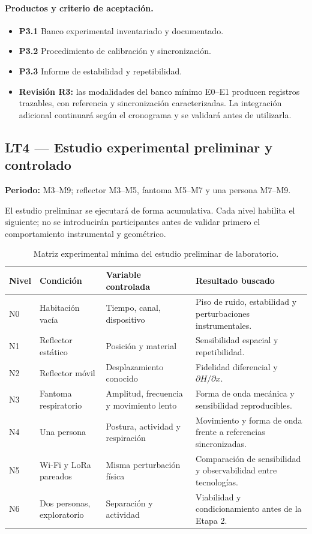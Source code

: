\paragraph{Productos y criterio de aceptación.}
\begin{itemize}
    \item \textbf{P3.1} Banco experimental inventariado y documentado.
    \item \textbf{P3.2} Procedimiento de calibración y sincronización.
    \item \textbf{P3.3} Informe de estabilidad y repetibilidad.
    \item \textbf{Revisión R3:} las modalidades del banco mínimo E0--E1 producen
    registros trazables, con referencia y sincronización caracterizadas. La integración
    adicional continuará según el cronograma y se validará antes de utilizarla.
\end{itemize}

\subsection{LT4 --- Estudio experimental preliminar y controlado}
\label{sec:wp4_stage1}

\textbf{Periodo:} M3--M9; reflector M3--M5, fantoma M5--M7 y una persona M7--M9.

El estudio preliminar se ejecutará de forma acumulativa. Cada nivel habilita el siguiente; no se
introducirán participantes antes de validar primero el comportamiento instrumental y
geométrico.

\begin{table}[H]
\centering
\caption{Matriz experimental mínima del estudio preliminar de laboratorio.}
\label{tab:lab_prepilot}
\small
\begin{tabularx}{\textwidth}{P{1.1cm}P{3.0cm}L L}
\toprule
\textbf{Nivel} & \textbf{Condición} & \textbf{Variable controlada} & \textbf{Resultado buscado}\\
\midrule
N0 & Habitación vacía & Tiempo, canal, dispositivo & Piso de ruido, estabilidad y perturbaciones instrumentales.\\
N1 & Reflector estático & Posición y material & Sensibilidad espacial y repetibilidad.\\
N2 & Reflector móvil & Desplazamiento conocido & Fidelidad diferencial y $\partial H/\partial x$.\\
N3 & Fantoma respiratorio & Amplitud, frecuencia y movimiento lento & Forma de onda mecánica y sensibilidad reproducibles.\\
N4 & Una persona & Postura, actividad y respiración & Movimiento y forma de onda frente a referencias sincronizadas.\\
N5 & Wi-Fi y LoRa pareados & Misma perturbación física & Comparación de sensibilidad y observabilidad entre tecnologías.\\
N6 & Dos personas, exploratorio & Separación y actividad & Viabilidad y condicionamiento antes de la Etapa 2.\\
\bottomrule
\end{tabularx}
\end{table}

